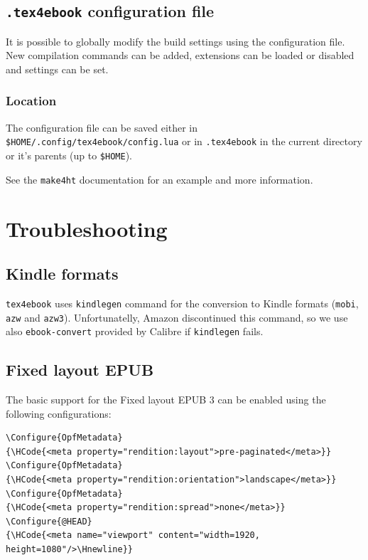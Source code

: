\hypertarget{tex4ebook-configuration-file}{%
\subsection{\texorpdfstring{\texttt{.tex4ebook} configuration
file}{.tex4ebook configuration file}}\label{tex4ebook-configuration-file}}

It is possible to globally modify the build settings using the
configuration file. New compilation commands can be added, extensions
can be loaded or disabled and settings can be set.

\hypertarget{location}{%
\subsubsection{Location}\label{location}}

The configuration file can be saved either in
\texttt{\$HOME/.config/tex4ebook/config.lua} or in \texttt{.tex4ebook}
in the current directory or it's parents (up to \texttt{\$HOME}).

See the \texttt{make4ht} documentation for an example and more
information.

\hypertarget{troubleshooting}{%
\section{Troubleshooting}\label{troubleshooting}}

\hypertarget{kindle-formats}{%
\subsection{Kindle formats}\label{kindle-formats}}

\texttt{tex4ebook} uses \texttt{kindlegen} command for the conversion to
Kindle formats (\texttt{mobi}, \texttt{azw} and \texttt{azw3}).
Unfortunatelly, Amazon discontinued this command, so we use also
\texttt{ebook-convert} provided by Calibre if \texttt{kindlegen} fails.

\hypertarget{fixed-layout-epub}{%
\subsection{Fixed layout EPUB}\label{fixed-layout-epub}}

The basic support for the Fixed layout EPUB 3 can be enabled using the
following configurations:

\begin{verbatim}
\Configure{OpfMetadata}
{\HCode{<meta property="rendition:layout">pre-paginated</meta>}}
\Configure{OpfMetadata}
{\HCode{<meta property="rendition:orientation">landscape</meta>}}
\Configure{OpfMetadata}
{\HCode{<meta property="rendition:spread">none</meta>}}
\Configure{@HEAD}
{\HCode{<meta name="viewport" content="width=1920, height=1080"/>\Hnewline}}
\end{verbatim}

